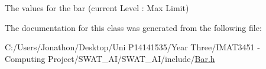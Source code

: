 The values for the bar (current Level \+: Max Limit) 



The documentation for this class was generated from the following file\+:\begin{DoxyCompactItemize}
\item 
C\+:/\+Users/\+Jonathon/\+Desktop/\+Uni P14141535/\+Year Three/\+I\+M\+A\+T3451 -\/ Computing Project/\+S\+W\+A\+T\+\_\+\+A\+I/\+S\+W\+A\+T\+\_\+\+A\+I/include/\hyperlink{_bar_8h}{Bar.\+h}\end{DoxyCompactItemize}
